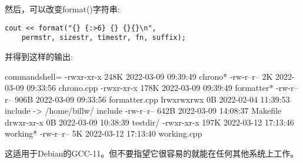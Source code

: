 然后，可以改变format()字符串:

\begin{lstlisting}[style=styleCXX]
cout << format("{} {:>6} {} {}{}\n",
	permstr, sizestr, timestr, fn, suffix);
\end{lstlisting}

并得到这样的输出:

\begin{tcblisting}{commandshell={}}
-rwxr-xr-x 248K 2022-03-09 09:39:49 chrono*
-rw-r--r--   2K 2022-03-09 09:33:56 chrono.cpp
-rwxr-xr-x 178K 2022-03-09 09:39:49 formatter*
-rw-r--r-- 906B 2022-03-09 09:33:56 formatter.cpp
lrwxrwxrwx   0B 2022-02-04 11:39:53 include -> /home/billw/
include
-rw-r--r-- 642B 2022-03-09 14:08:37 Makefile
drwxr-xr-x   0B 2022-03-09 10:38:39 testdir/
-rwxr-xr-x 197K 2022-03-12 17:13:46 working*
-rw-r--r--   5K 2022-03-12 17:13:40 working.cpp
\end{tcblisting}

这适用于Debian的GCC-11。但不要指望它很容易的就能在任何其他系统上工作。










